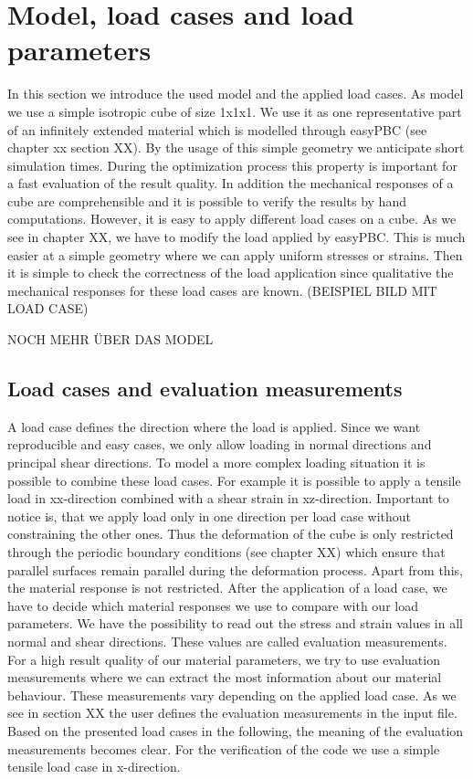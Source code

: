     \section{Model, load cases and load parameters}
    In this section we introduce the used model and the applied load cases. 
    As model we use a simple isotropic cube of size 1x1x1. We use it as one representative part of an infinitely extended material which is modelled through easyPBC (see chapter xx section XX). By the usage of this simple geometry we anticipate short simulation times. During the optimization process this property is important for a fast evaluation of the result quality. In addition the mechanical responses of a cube are comprehensible and it is possible to verify the results by hand computations. However, it is easy to apply different load cases on a cube. As we see in chapter XX, we have to modify the load applied by easyPBC. This is much easier at a simple geometry where we can apply uniform stresses or strains. Then it is simple to check the correctness of the load application since qualitative the mechanical responses for these load cases are known. (BEISPIEL BILD MIT LOAD CASE)
    
    NOCH MEHR ÜBER DAS MODEL
    
    \subsection{Load cases and evaluation measurements}
    
    A load case defines the direction where the load is applied. Since we want reproducible and easy cases, we only allow loading in normal directions and principal shear directions. To model a more complex loading situation it is possible to combine these load cases. For example it is possible to apply a tensile load in xx-direction combined with a shear strain in xz-direction. Important to notice is, that we apply load only in one direction per load case without constraining the other ones. Thus the deformation of the cube is only restricted through the periodic boundary conditions (see chapter XX) which ensure that parallel surfaces remain parallel during the deformation process. Apart from this, the material response is not restricted. After the application of a load case, we have to decide which material responses we use to compare with our load parameters. We have the possibility to read out the stress and strain values in all normal and shear directions. These values are called evaluation measurements. For a high result quality of our material parameters, we try to use evaluation measurements where we can extract the most information about our material behaviour. These measurements vary depending on the applied load case. As we see in section XX the user defines the evaluation measurements in the input file. Based on the presented load cases in the following, the meaning of the evaluation measurements becomes clear. 
    For the verification of the code we use a simple tensile load case in x-direction.
    
